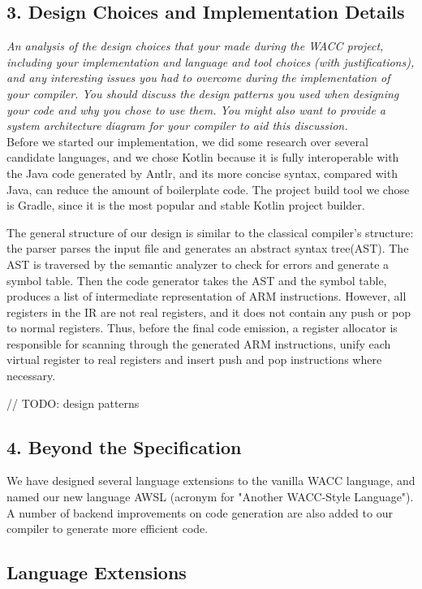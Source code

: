 \documentclass[10pt,a4paper]{report}
\begin{document}
  \subsection*{3. Design Choices and Implementation Details}
  \textit{An analysis of the design choices that your made during the WACC
  project, including your implementation and language and tool choices (with
  justifications), and any interesting issues you had to overcome during the
  implementation of your compiler. You should discuss the design patterns you
  used when designing your code and why you chose to use them. You might also
  want to provide a system architecture diagram for your compiler to aid this
  discussion.}\\
  Before we started our implementation, we did some research over several candidate languages, and we chose Kotlin because it is
  fully interoperable with the Java code generated by Antlr, and its more concise syntax, compared with Java, can reduce the amount 
  of boilerplate code. The project build tool we chose is Gradle, since it is the most popular and stable Kotlin project builder.

  The general structure of our design is similar to the classical compiler's structure: the parser parses the input file and generates
  an abstract syntax tree(AST). The AST is traversed by the semantic analyzer to check for errors and generate a symbol table.
  Then the code generator takes the AST and the symbol table, produces a list of intermediate representation of ARM instructions.
  However, all registers in the IR are not real registers, and it does not contain any push or pop to normal registers. Thus, before the
  final code emission, a register allocator is responsible for scanning through the generated ARM instructions, unify each virtual 
  register to real registers and insert push and pop instructions where necessary.

  // TODO: design patterns

  \subsection*{4. Beyond the Specification}
  We have designed several language extensions to the vanilla WACC language, and named our new language AWSL (acronym for "Another WACC-Style Language").
  A number of backend improvements on code generation are also added to our compiler to generate more efficient code.
  \subsection*{Language Extensions}
\end{document}
